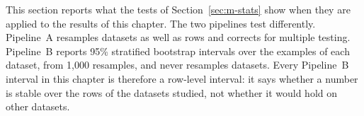 This section reports what the tests of Section~\ref{sec:m-stats} show when they are applied to the results of this chapter.
The two pipelines test differently.
Pipeline~A resamples datasets as well as rows and corrects for multiple testing. %
Pipeline~B reports 95\% stratified bootstrap intervals over the examples of each dataset, from 1{,}000 resamples, and never resamples datasets. %
Every Pipeline~B interval in this chapter is therefore a row-level interval: it says whether a number is stable over the rows of the datasets studied, not whether it would hold on other datasets. %

